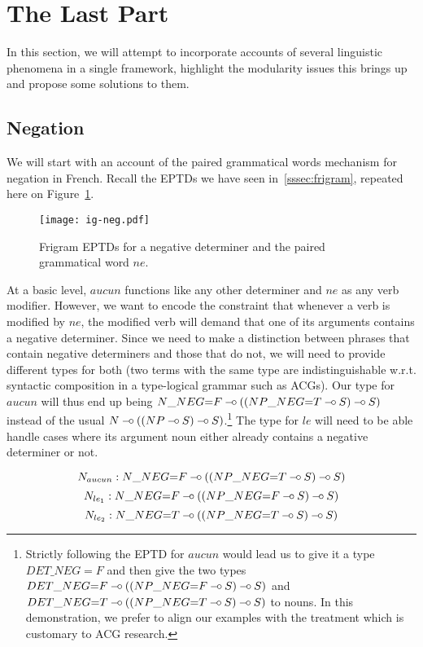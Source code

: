 \section{The Last Part}

In this section, we will attempt to incorporate accounts of several
linguistic phenomena in a single framework, highlight the modularity
issues this brings up and propose some solutions to them.


\subsection{Negation}

We will start with an account of the paired grammatical words mechanism
for negation in French. Recall the EPTDs we have seen
in~\ref{sssec:frigram}, repeated here on Figure~\ref{fig:ig-neg-rep}.

\begin{figure}
  \centering
  \texttt{[image: ig-neg.pdf]}
  \caption{\label{fig:ig-neg-rep} Frigram EPTDs for a negative
    determiner and the paired grammatical word $ne$.}
\end{figure}

At a basic level, $aucun$ functions like any other determiner and $ne$
as any verb modifier. However, we want to encode the constraint that
whenever a verb is modified by $ne$, the modified verb will demand that
one of its arguments contains a negative determiner. Since we need to
make a distinction between phrases that contain negative determiners and
those that do not, we will need to provide different types for both (two
terms with the same type are indistinguishable w.r.t. syntactic
composition in a type-logical grammar such as ACGs). Our type for
$aucun$ will thus end up being $N\_NEG{=}F \mathbin{{-}\mkern-3.5mu{\circ}} ((NP\_NEG{=}T \mathbin{{-}\mkern-3.5mu{\circ}} S)
\mathbin{{-}\mkern-3.5mu{\circ}} S)$ instead of the usual $N \mathbin{{-}\mkern-3.5mu{\circ}} ((NP \mathbin{{-}\mkern-3.5mu{\circ}} S) \mathbin{{-}\mkern-3.5mu{\circ}}
S)$.\footnote{Strictly following the EPTD for $aucun$ would lead us to
  give it a type $DET\_NEG{=}F$ and then give the two types
  $DET\_NEG{=}F \mathbin{{-}\mkern-3.5mu{\circ}} ((NP\_NEG{=}F \mathbin{{-}\mkern-3.5mu{\circ}} S) \mathbin{{-}\mkern-3.5mu{\circ}} S)$ and $DET\_NEG{=}T
  \mathbin{{-}\mkern-3.5mu{\circ}} ((NP\_NEG{=}T \mathbin{{-}\mkern-3.5mu{\circ}} S) \mathbin{{-}\mkern-3.5mu{\circ}} S)$ to nouns. In this
  demonstration, we prefer to align our examples with the treatment
  which is customary to ACG research.} The type for $le$ will need to be
able handle cases where its argument noun either already contains a
negative determiner or not.

$$
N_{aucun} : N\_NEG{=}F \mathbin{{-}\mkern-3.5mu{\circ}} ((NP\_NEG{=}T \mathbin{{-}\mkern-3.5mu{\circ}} S) \mathbin{{-}\mkern-3.5mu{\circ}} S)
$$
$$
N_{le_1} : N\_NEG{=}F \mathbin{{-}\mkern-3.5mu{\circ}} ((NP\_NEG{=}F \mathbin{{-}\mkern-3.5mu{\circ}} S) \mathbin{{-}\mkern-3.5mu{\circ}} S)
$$
$$
N_{le_2} : N\_NEG{=}T \mathbin{{-}\mkern-3.5mu{\circ}} ((NP\_NEG{=}T \mathbin{{-}\mkern-3.5mu{\circ}} S) \mathbin{{-}\mkern-3.5mu{\circ}} S)
$$



